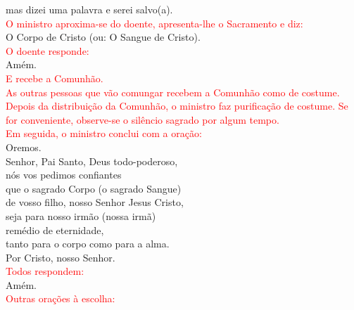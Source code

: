 \documentclass{book}
\begin{document}
\begin{flushleft}
    mas dizei uma palavra e serei salvo(a).
    \vspace{.1cm} \\
    \textcolor{red}{O ministro aproxima-se do doente, apresenta-lhe o Sacramento e diz:}
    \vspace{.1cm} \\
    O Corpo de Cristo (ou: O Sangue de Cristo).
    \vspace{.1cm} \\
    \textcolor{red}{O doente responde:}
    \vspace{.1cm} \\
    Amém.
    \vspace{.1cm} \\
    \textcolor{red}{E recebe a Comunhão.}
    \vspace{.1cm} \\
    \textcolor{red}{As outras pessoas que vão comungar recebem a Comunhão como de costume.}
    \vspace{.1cm} \\
    \textcolor{red}{Depois da distribuição da Comunhão, o ministro faz purificação de costume. Se for conveniente, observe-se o silêncio sagrado por algum tempo.}
    \vspace{.1cm} \\
    \textcolor{red}{Em seguida, o ministro conclui com a oração:}
    \vspace{.1cm} \\
    Oremos.
    \vspace{.1cm} \\
    Senhor, Pai Santo, Deus todo-poderoso, \\
    nós vos pedimos confiantes \\
    que o sagrado Corpo (o sagrado Sangue) \\
    de vosso filho, nosso Senhor Jesus Cristo, \\
    seja para nosso irmão (nossa irmã) \\
    remédio de eternidade, \\
    tanto para o corpo como para a alma. \\
    Por Cristo, nosso Senhor.
    \vspace{.1cm} \\
    \textcolor{red}{Todos respondem:}
    \vspace{.1cm} \\
    Amém.
    \vspace{.1cm} \\
    \textcolor{red}{Outras orações à escolha:}

\end{flushleft}
\end{document}
